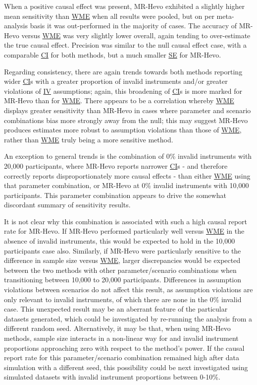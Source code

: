 \documentclass[
]{article}
\begin{document}
\leavevmode\newline When a positive causal effect was present, MR-Hevo exhibited a slightly higher mean sensitivity than \hyperref[acronyms_WME]{WME} when all results were pooled, but on per meta-analysis basis it was out-performed in the majority of cases. The accuracy of MR-Hevo versus \hyperref[acronyms_WME]{WME} was very slightly lower overall, again tending to over-estimate the true causal effect. Precision was similar to the null causal effect case, with a comparable \hyperref[acronyms_CI]{CI} for both methods, but a much smaller \hyperref[acronyms_SE]{SE} for MR-Hevo.

Regarding consistency, there are again trends towards both methods reporting wider \hyperref[acronyms_CI]{CI}s with a greater proportion of invalid instruments and/or greater violations of \hyperref[acronyms_IV]{IV} assumptions; again, this broadening of \hyperref[acronyms_CI]{CI}s is more marked for MR-Hevo than for \hyperref[acronyms_WME]{WME}. There appears to be a correlation whereby \hyperref[acronyms_WME]{WME} displays greater sensitivity than MR-Hevo in cases where parameter and scenario combinations bias more strongly away from the null; this may suggest MR-Hevo produces estimates more robust to assumption violations than those of \hyperref[acronyms_WME]{WME}, rather than \hyperref[acronyms_WME]{WME} truly being a more sensitive method.

An exception to general trends is the combination of 0\% invalid instruments with 20,000 participants, where MR-Hevo reports narrower \hyperref[acronyms_CI]{CI}s - and therefore correctly reports disproportionately more causal effects - than either \hyperref[acronyms_WME]{WME} using that parameter combination, or MR-Hevo at 0\% invalid instruments with 10,000 participants. This parameter combination appears to drive the somewhat discordant summary of sensitivity results.

It is not clear why this combination is associated with such a high causal report rate for MR-Hevo. If MR-Hevo performed particularly well versus \hyperref[acronyms_WME]{WME} in the absence of invalid instruments, this would be expected to hold in the 10,000 participants case also. Similarly, if MR-Hevo were particularly sensitive to the difference in sample size versus \hyperref[acronyms_WME]{WME}, larger discrepancies would be expected between the two methods with other parameter/scenario combinations when transitioning between 10,000 to 20,000 participants. Differences in assumption violations between scenarios do not affect this result, as assumption violations are only relevant to invalid instruments, of which there are none in the 0\% invalid case. This unexpected result may be an aberrant feature of the particular datasets generated, which could be investigated by re-running the analysis from a different random seed. Alternatively, it may be that, when using MR-Hevo methods, sample size interacts in a non-linear way for and invalid instrument proportions approaching zero with respect to the method's power. If the causal report rate for this parameter/scenario combination remained high after data simulation with a different seed, this possibility could be next investigated using simulated datasets with invalid instrument proportions between 0-10\%.
\end{document}
